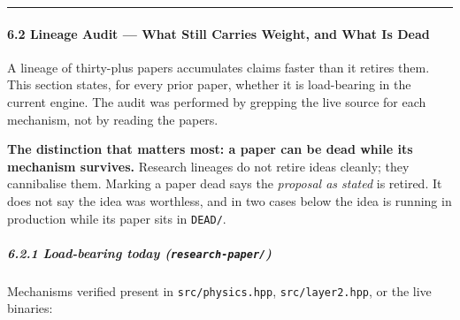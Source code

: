 \documentclass[
  11pt,
  a4paper,
]{article}
\begin{document}
\begin{center}\rule{0.5\linewidth}{0.5pt}\end{center}

\paragraph{6.2 Lineage Audit --- What Still Carries Weight, and What Is
Dead}\label{lineage-audit-what-still-carries-weight-and-what-is-dead}

A lineage of thirty-plus papers accumulates claims faster than it
retires them. This section states, for every prior paper, whether it is
load-bearing in the current engine. The audit was performed by grepping
the live source for each mechanism, not by reading the papers.

\textbf{The distinction that matters most: a paper can be dead while its
mechanism survives.} Research lineages do not retire ideas cleanly; they
cannibalise them. Marking a paper dead says the \emph{proposal as
stated} is retired. It does not say the idea was worthless, and in two
cases below the idea is running in production while its paper sits in
\texttt{DEAD/}.

\subparagraph{\texorpdfstring{6.2.1 Load-bearing today
(\texttt{research-paper/})}{6.2.1 Load-bearing today (research-paper/)}}\label{load-bearing-today-research-paper}

Mechanisms verified present in \texttt{src/physics.hpp},
\texttt{src/layer2.hpp}, or the live binaries:
\end{document}
